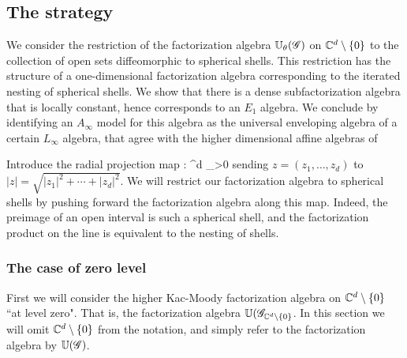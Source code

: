 \documentclass[10pt]{amsart}
\begin{document}

\subsection{The strategy}

We consider the restriction of the factorization algebra $\mathbb U_\theta (\mathscr G)$ on $\mathbb C^{d} \setminus \{0\}$ to the collection of open sets diffeomorphic to spherical shells.
This restriction has the structure of a one-dimensional factorization algebra corresponding to the iterated nesting of spherical shells. 
We show that there is a dense subfactorization algebra that is locally constant, hence corresponds to an $E_1$ algebra.
We conclude by identifying an $A_\infty$ model for this algebra as the universal enveloping algebra of a certain $L_\infty$ algebra, that agree with the higher dimensional affine algebras of \cite{FHK}

Introduce the radial projection map
\ben
\rho : \CC^d  \to \RR_{>0}
\een
sending $z = (z_1, \ldots, z_d)$ to $|z| = \sqrt{|z_1|^2 + \cdots + |z_d|^2}$. 
We will restrict our factorization algebra to spherical shells by pushing forward the factorization algebra along this map.
Indeed, the preimage of an open interval is such a spherical shell, and the factorization product on the line is equivalent to the nesting of shells. 

\subsubsection{The case of zero level}

First we will consider the higher Kac-Moody factorization algebra on $\mathbb C^d \setminus \{0\}$ ``at level zero". That is, the factorization algebra $\mathbb U(\mathscr G_{\mathbb C^d \setminus\{0\}}$.
In this section we will omit $\mathbb C^d \setminus \{0\}$ from the notation, and simply refer to the factorization algebra by $\mathbb U(\mathscr G)$. 
\end{document}
